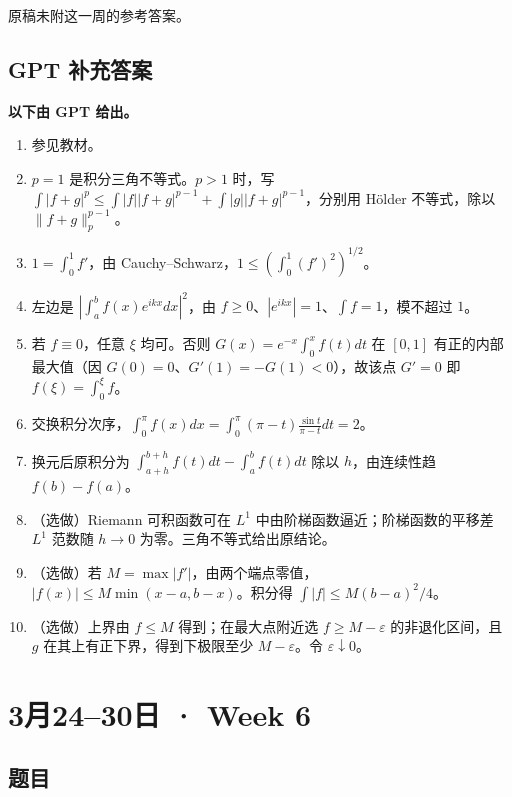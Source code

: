 \documentclass[UTF8,11pt, a4paper, oneside, fontset=none]{ctexbook}
\begin{document}
\noindent 原稿未附这一周的参考答案。

\clearpage

\subsection*{GPT 补充答案}

\noindent\textbf{以下由 GPT 给出。}
\begin{enumerate}
\item 参见教材。
\item $p=1$ 是积分三角不等式。$p>1$ 时，写 $\int|f+g|^p\le\int|f||f+g|^{p-1}+\int|g||f+g|^{p-1}$，分别用 H\"older 不等式，除以 $\lVert{}f+g\rVert_p^{p-1}$。
\item $1=\int_0^1f'$，由 Cauchy--Schwarz，$1\le(\int_0^1(f')^2)^{1/2}$。
\item 左边是 $|\int_a^b f(x)e^{ikx}dx|^2$，由 $f\ge0$、$|e^{ikx}|=1$、$\int f=1$，模不超过 $1$。
\item 若 $f\equiv0$，任意 $\xi$ 均可。否则 $G(x)=e^{-x}\int_0^xf(t)dt$ 在 $[0,1]$ 有正的内部最大值（因 $G(0)=0$、$G'(1)=-G(1)<0$），故该点 $G'=0$ 即 $f(\xi)=\int_0^\xi f$。
\item 交换积分次序，$\int_0^\pi f(x)dx=\int_0^\pi(\pi-t)\frac{\sin t}{\pi-t}dt=2$。
\item 换元后原积分为 $\int_{a+h}^{b+h}f(t)dt-\int_a^bf(t)dt$ 除以 $h$，由连续性趋 $f(b)-f(a)$。
\item（选做）Riemann 可积函数可在 $L^1$ 中由阶梯函数逼近；阶梯函数的平移差 $L^1$ 范数随 $h\to0$ 为零。三角不等式给出原结论。
\item（选做）若 $M=\max|f'|$，由两个端点零值，$|f(x)|\le M\min(x-a,b-x)$。积分得 $\int|f|\le M(b-a)^2/4$。
\item（选做）上界由 $f\le M$ 得到；在最大点附近选 $f\ge M-\varepsilon$ 的非退化区间，且 $g$ 在其上有正下界，得到下极限至少 $M-\varepsilon$。令 $\varepsilon\downarrow0$。
\end{enumerate}

\clearpage

\section{3月24--30日 · Week 6}

\subsection*{题目}
\end{document}
